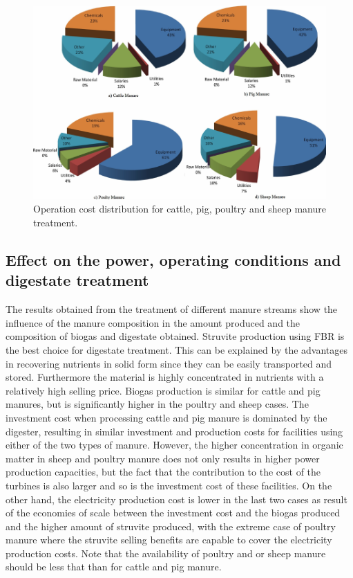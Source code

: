 \begin{refsection}[referencesCh2]
\begin{figure}[h]
	\centering
	\includegraphics[width=0.9\linewidth, trim={0cm 0cm 0cm 0cm},clip]{gfx/Chapter2/Fig8.pdf} 
	\caption{Operation cost distribution for cattle, pig, poultry and sheep manure treatment.}
	\label{fig:OpCost}
\end{figure}

\subsection{Effect on the power, operating conditions and digestate treatment} \label{section:Effect}
The results obtained from the treatment of different manure streams show the influence of the manure composition in the amount produced and the composition of biogas and digestate obtained. Struvite production using FBR is the best choice for digestate treatment. This can be explained by the advantages in recovering nutrients in solid form since they can be easily transported and stored. Furthermore the material is highly concentrated in nutrients with a relatively high selling price. Biogas production is similar for cattle and pig manures, but is significantly higher in the poultry and sheep cases. The investment cost when processing cattle and pig manure is dominated by the digester, resulting in similar investment and production costs for facilities using either of the two types of manure. However, the higher concentration in organic matter in sheep and poultry manure does not only results in higher power production capacities, but the fact that the contribution to the cost of the turbines is also larger and so is the investment cost of these facilities. On the other hand, the electricity production cost is lower in the last two cases as result of the economies of scale between the investment cost and the biogas produced and the higher amount of struvite produced, with the extreme case of poultry manure where the struvite selling benefits are capable to cover the electricity production costs. Note that the availability of poultry and or sheep manure should be less that than for cattle and pig manure.



\end{refsection}
